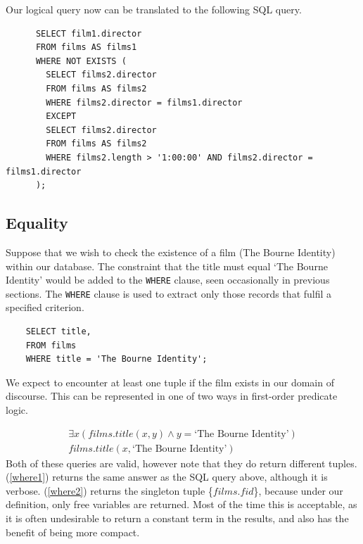 \documentclass[a4paper, 11pt]{article}
\begin{document}
      Our logical query now can be translated to the following SQL query.
      \begin{verbatim}
      SELECT film1.director
      FROM films AS films1
      WHERE NOT EXISTS (
        SELECT films2.director
        FROM films AS films2
        WHERE films2.director = films1.director
        EXCEPT
        SELECT films2.director
        FROM films AS films2
        WHERE films2.length > '1:00:00' AND films2.director = films1.director
      );
      \end{verbatim}

  \subsection{Equality}
    Suppose that we wish to check the existence of a film (The Bourne
    Identity) within our database. The constraint that the title must equal
    `The Bourne Identity' would be added to the \texttt{WHERE} clause, seen
    occasionally in previous sections. The \texttt{WHERE} clause is used to
    extract only those records that fulfil a specified
    criterion\cite{w3WHERE}.
    \begin{verbatim}
    SELECT title,
    FROM films
    WHERE title = 'The Bourne Identity';
    \end{verbatim}
    We expect to encounter at least one tuple if the film exists in our domain
    of discourse. This can be represented in one of two ways in first-order
    predicate logic.

    \begin{gather}
      \exists x(films.title(x, y) \land y = \text{`The Bourne
      Identity'})\label{where1}\\
      films.title(x, \text{`The Bourne Identity'})\label{where2}
    \end{gather}
    Both of these queries are valid, however note that they do return
    different tuples. (\ref{where1}) returns the same answer as the SQL query
    above, although it is verbose. (\ref{where2}) returns the singleton tuple
    \{$films.fid$\}, because under our definition, only free variables are
    returned. Most of the time this is acceptable, as it is often undesirable
    to return a constant term in the results, and also has the benefit of
    being more compact.
\end{document}
